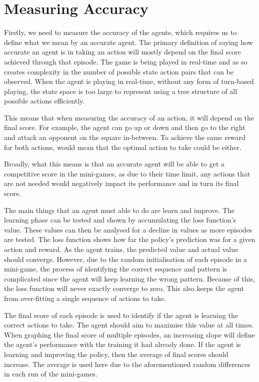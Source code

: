 \section{Measuring Accuracy}

Firstly, we need to measure the accuracy of the agents, which requires us to
define what we mean by an accurate agent. The primary definition of saying how
accurate an agent is in taking an action will mostly depend on the final score
achieved through that episode. The game is being played in real-time and as so
creates complexity in the number of possible state action pairs that can be
observed. When the agent is playing in real-time, without any form of turn-based
playing, the state space is too large to represent using a tree structure of
all possible actions efficiently.

This means that when measuring the accuracy of an action, it will depend on the
final score. For example, the agent can go up or down and then go to the right
and attack an opponent on the square in-between. To achieve the same reward for
both actions, would mean that the optimal action to take could be either.

Broadly, what this means is that an accurate agent will be able to get a
competitive score in the mini-games, as due to their time limit, any actions
that are not needed would negatively impact its performance and in turn its
final score.

The main things that an agent must able to do are learn and improve. The learning
phase can be tested and shown by accumulating the loss function's value. These
values can then be analysed for a decline in values as more episodes are tested.
The loss function shows how far the policy's prediction was for a given action
and reward. As the agent trains, the predicted value and actual value should
converge. However, due to the random initialisation of each episode in a
mini-game, the process of identifying the correct sequence and pattern is
complicated since the agent will keep learning the wrong pattern. Because of this,
the loss function will never exactly converge to zero. This also keeps the
agent from over-fitting a single sequence of actions to take.

The final score of each episode is used to identify if the agent is learning the
correct actions to take. The agent should aim to maximise this value at all
times. When graphing the final score of multiple episodes, an increasing slope
will define the agent's performance with the training it had already done. If the
agent is learning and improving the policy, then the average of final scores
should increase. The average is used here due to the aforementioned random
differences in each run of the mini-games.

